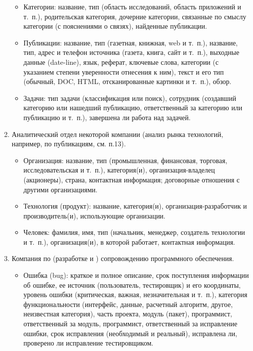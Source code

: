 \documentclass[12pt, openany, twoside]{book} %
\begin{document}
\begin{enumerate}
\begin{itemize}
\item Категории: название, тип (область исследований, область приложений и т.~п.), родительская категория, дочерние категории, связанные по смыслу категории (с пояснениями о связях), найденные публикации.
\item Публикации: название, тип (газетная, книжная, web и т.~п.), название, тип, адрес и телефон источника (газета, книга, сайт и т.~п.), выходные данные (date-line), язык, реферат, ключевые слова, категории (с указанием степени уверенности отнесения к ним), текст и его тип (обычный, DOC, HTML, отсканированные картинки и т.~п.), обзор.
\item Задачи: тип задачи (классификация или поиск), сотрудник (создавший категорию или нашедший публикацию, ответственный за категорию или публикацию и т.~п.), завершена ли работа над задачей.
\end{itemize}
\item Аналитический отдел некоторой компании (анализ рынка технологий, например, по публикациям, см. п.13).
\begin{itemize}
\item Организация: название, тип (промышленная, финансовая, торговая, исследовательская и т.~п.), категория(и), организация-владелец (акционеры), страна, контактная информация; договорные отношения с другими организациями.
\item Технология (продукт): название, категория(и), организация-разработчик и производитель(и), использующие организации.
\item Человек: фамилия, имя, тип (начальник, менеджер, создатель технологии и т.~п.), организация(и), в которой работает, контактная информация.
\end{itemize}
\item Компания по (разработке и ) сопровождению программного обеспечения.
\begin{itemize}
\item Ошибка (bug): краткое и полное описание, срок поступления информации об ошибке, ее источник (пользователь, тестировщик) и его координаты, уровень ошибки (критическая, важная, незначительная и т.~п.), категория функциональности (интерфейс, данные, расчетный алгоритм, другое, неизвестная категория), часть проекта, модуль (пакет), программист, ответственный за модуль, программист, ответственный за исправление ошибки, срок исправления (необходимый и реальный), исправлена ли, проверено ли исправление тестировщиком.
\end{itemize}
\end{enumerate}
\end{document}
